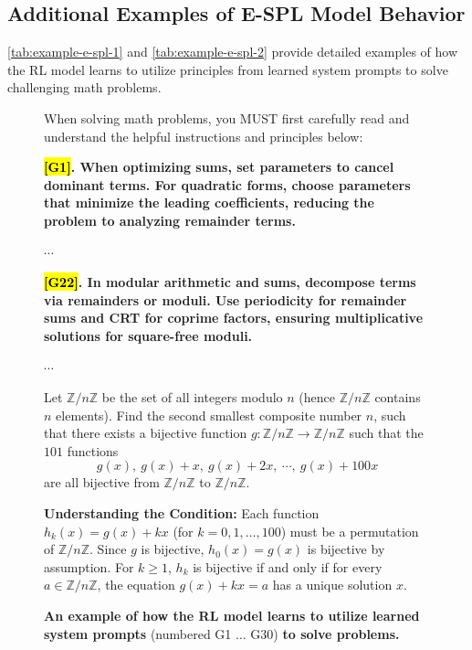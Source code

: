 \documentclass{article}
\theoremstyle{plain}
\theoremstyle{definition}
\theoremstyle{remark}
\begin{document}
\subsection{Additional Examples of E-SPL Model Behavior}

\autoref{tab:example-e-spl-1} and \autoref{tab:example-e-spl-2} provide detailed examples of how the RL model learns to utilize principles from learned system prompts to solve challenging math problems.

\begin{figure}[!tb]
\centering
\caption{\textbf{An example of how the RL model learns to utilize learned system prompts} (numbered G1 $\dots$ G30) \textbf{to solve problems.}}

\begin{runcard}[title={Example of How E-SPL Shapes Model Behavior}]

\medskip

\begin{runbox}[title={\textbf{Learned System Prompt}}]
When solving math problems, you MUST first carefully read and understand the helpful instructions and principles below:

\textbf{\color{Brown}\hl{{[G1]}}. When optimizing sums, set parameters to cancel dominant terms. For quadratic forms, choose parameters that minimize the leading coefficients, reducing the problem to analyzing remainder terms.}

$\cdots$

\textbf{\color{Brown}\hl{{[G22]}}. In modular arithmetic and sums, decompose terms via remainders or moduli. Use periodicity for remainder sums and CRT for coprime factors, ensuring multiplicative solutions for square-free moduli.}

$\cdots$
\end{runbox}

\begin{runbox}[title={Problem}]
Let \(\mathbb{Z}/n\mathbb{Z}\) be the set of all integers modulo \(n\) (hence \(\mathbb{Z}/n\mathbb{Z}\) contains \(n\) elements). Find the second smallest composite number \(n\), such that there exists a bijective function \(g:\mathbb{Z}/n\mathbb{Z}\to \mathbb{Z}/n\mathbb{Z}\) such that the \(101\) functions
\[ g(x),\ g(x)+x,\ g(x)+2x,\ \cdots,\ g(x)+100x \]
are all bijective from \(\mathbb{Z}/n\mathbb{Z}\) to \(\mathbb{Z}/n\mathbb{Z}\).
\end{runbox}

\begin{runbox}[title={Model Output}]
\textbf{Understanding the Condition:}
Each function \(h_k(x) = g(x) + kx\) (for \(k=0,1,\ldots,100\)) must be a permutation of \(\mathbb{Z}/n\mathbb{Z}\). Since \(g\) is bijective, \(h_0(x)=g(x)\) is bijective by assumption. For \(k \geq 1\), \(h_k\) is bijective if and only if for every \(a \in \mathbb{Z}/n\mathbb{Z}\), the equation \(g(x) + kx = a\) has a unique solution \(x\).


\end{runbox}
\end{runcard}
\end{figure}
\end{document}

